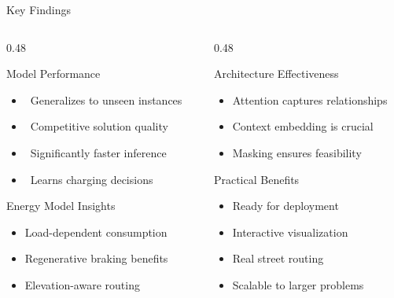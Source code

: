 \documentclass[aspectratio=169,11pt]{beamer}
\newcommand{\cmark}{\ding{51}}
\begin{document}
\begin{frame}{Key Findings}
    \begin{columns}[T]
        \begin{column}{0.48\textwidth}
            \begin{block}{Model Performance}
                \begin{itemize}
                    \item \cmark~Generalizes to unseen instances
                    \item \cmark~Competitive solution quality
                    \item \cmark~Significantly faster inference
                    \item \cmark~Learns charging decisions
                \end{itemize}
            \end{block}
            
            \begin{block}{Energy Model Insights}
                \begin{itemize}
                    \item Load-dependent consumption
                    \item Regenerative braking benefits
                    \item Elevation-aware routing
                \end{itemize}
            \end{block}
        \end{column}
        \begin{column}{0.48\textwidth}
            \begin{block}{Architecture Effectiveness}
                \begin{itemize}
                    \item Attention captures relationships
                    \item Context embedding is crucial
                    \item Masking ensures feasibility
                \end{itemize}
            \end{block}
            
            \begin{block}{Practical Benefits}
                \begin{itemize}
                    \item Ready for deployment
                    \item Interactive visualization
                    \item Real street routing
                    \item Scalable to larger problems
                \end{itemize}
            \end{block}
        \end{column}
    \end{columns}
\end{frame}
\end{document}
